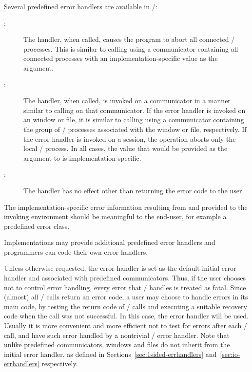 Several predefined error handlers are available in \MPI/:
\begin{description}
\item[:] The handler, when called, causes the
program to abort all connected \MPI/ processes.
This is similar to calling  using a communicator
containing all connected processes with an implementation-specific value as the
 argument.

\item[:] The handler, when called, is invoked on a communicator
in a manner similar to calling  on that communicator.  If the
error handler is invoked on an window or file, it is similar to
calling  using a communicator containing the group
of \MPI/ processes associated with the window or file, respectively.
If the error handler is invoked on a session,
the operation aborts only the local \mpi/ process.
In all cases,
the value that would be provided as the  argument to
 is implementation-specific.

\item[:] The handler has no effect
other than returning the error code to the user.
\end{description}

\begin{implementors}
    The implementation-specific error information resulting from
     and
     provided to the invoking environment should be
    meaningful to the end-user, for example a predefined error class.
\end{implementors}

Implementations may provide additional predefined error handlers and
programmers can code their own error handlers.

Unless otherwise requested, the error handler
 is set as the default initial error
handler and associated with predefined communicators.
Thus, if the user chooses not to control error handling,
every error that \MPI/ handles is treated as fatal.
Since (almost) all \MPI/ calls return an error code, a user may choose to handle
errors in its main code, by testing the return code of \MPI/ calls and
executing a
suitable recovery code when the call was not successful.  In this case, the
error handler  will be used.   Usually it is more
convenient and more efficient not to test for errors after each \MPI/ call, and
have such error handled by a nontrivial \MPI/ error handler. Note that unlike 
predefined communicators, windows and files do not inherit from the initial error handler, 
as defined in Sections~\ref{sec:1sided-errhandlers} and~\ref{sec:io-errhandlers} respectively.

